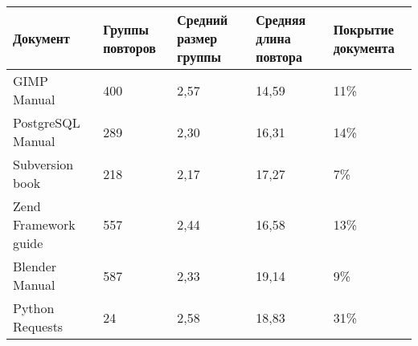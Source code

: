 \begin{minipage}{0.9\textwidth}
\begin{adjustbox}{center}
\begin{tabular}{|l||m{}|m{}|m{}|m{}|}
	\hline
	Документ & Группы повторов & Средний размер группы & Средняя длина повтора & Покрытие документа \\
	\hline
	\hline
	GIMP Manual & 400 & 2,57 & 14,59 & 11\% \\
	\hline
	PostgreSQL Manual & 289 & 2,30 & 16,31  & 14\% \\
	\hline
	Subversion book & 218 & 2,17 & 17,27 & 7\% \\
	\hline
	Zend Framework guide & 557 & 2,44 & 16,58 & 13\% \\
	\hline
	Blender Manual & 587 & 2,33 & 19,14 & 9\% \\
	\hline
	Python Requests & 24 & 2,58 & 18,83 & 31\% \\
	\hline
\end{tabular}
\end{adjustbox}
\end{minipage}